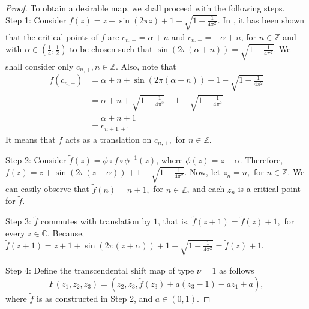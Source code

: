 \documentclass[12pt, reqno]{amsart}
\numberwithin{equation}{section}
\theoremstyle{definition}
\theoremstyle{remark}
\theoremstyle{plain}
\theoremstyle{definition}
\numberwithin{equation}{section}
\begin{document}
\begin{proof}
To obtain a desirable map, we shall proceed with the following steps.\\
\noindent Step 1: Consider $f(z)=z+\sin(2\pi z)+1-\sqrt{1-\frac{1}{4\pi^2}}$. 
In \cite{Arosio}, it has been shown that the 
critical points of $f$ 
are $c_{n,+}=\alpha+n$ 
and $c_{n,-}=-\alpha+n$, 
for $n\in\mathbb{Z}$ and with $\alpha\in \left(\frac{1}{4},\frac{1}{2}\right)$ 
to be chosen such that $\sin(2\pi(\alpha+n))=\sqrt{1-\frac{1}{4\pi^2}}.$ 
We shall consider only $c_{n,+}, n\in\mathbb{Z}$. Also, note that 
\begin{align*}
f(c_{n,+})&=\alpha+n+\sin(2\pi(\alpha+n))+1-\sqrt{1-\frac{1}{4\pi^2}}\\
&=\alpha+n+\sqrt{1-\frac{1}{4\pi^2}}+1-\sqrt{1-\frac{1}{4\pi^2}}\\
&=\alpha+n+1\\
&=c_{n+1,+}.
\end{align*}
It means that $f$ acts as a translation on $c_{n,+},$ for $n\in\mathbb{Z}$.

\noindent Step 2: Consider $\widetilde{f}(z)=\phi\circ f\circ \phi^{-1}(z)$, 
where $\phi(z)=z-\alpha$. 
Therefore, $\widetilde{f}(z)=z+\sin (2\pi(z+\alpha))+1-\sqrt{1-\frac{1}{4\pi^2}}$. 
Now, let $z_n=n,$ for $n\in\mathbb{Z}$. 
We can easily observe that $\widetilde{f}(n)=n+1,$ 
for  $n\in\mathbb{Z}$, 
and each $z_n$ is a critical point for $\tilde{f}$.

\noindent Step 3: $\widetilde{f}$ commutes with translation by $1$, 
that is, $\widetilde{f}(z+1)=\widetilde{f}(z)+1,$ 
for every $z\in\mathbb{C}.$ 
Because, $\widetilde{f}(z+1)=z+1+\sin (2\pi(z+\alpha))+1-\sqrt{1-\frac{1}{4\pi^2}}=\widetilde{f}(z)+1$.

\noindent Step 4: Define the transcendental shift map of type $\nu=1$ as follows
\[F(z_1,z_2, z_3)=\left(z_2,z_3,\widetilde{f}(z_{3})+a(z_{3}-1)-a z_1+a\right),\]
where $\widetilde{f}$ is as constructed in Step 2, and $a\in(0,1)$. 


\end{proof}
\end{document}
